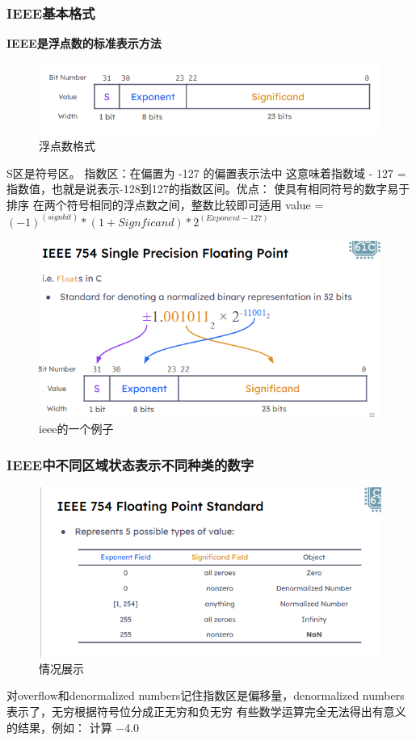 \documentclass{ctexart}
\begin{document}
\subsubsection{IEEE基本格式}
\textbf{IEEE是浮点数的标准表示方法}
\begin{figure}
    \centering
    \includegraphics[width=0.25\linewidth]{浮点数格式.png}
    \caption{浮点数格式}
    \label{fig:enter-label}
\end{figure}
S区是符号区。
指数区：在偏置为 -127 的偏置表示法中
这意味着指数域 - 127 = 指数值，也就是说表示-128到127的指数区间。优点：
使具有相同符号的数字易于排序
在两个符号相同的浮点数之间，整数比较即可适用
value = $(-1)^(sign bit)*(1+Signficand)*2^(Exponent-127)$
\begin{figure}
    \centering
    \includegraphics[width=0.5\linewidth]{ieee的一个例子.png}
    \caption{ieee的一个例子}
    \label{fig:enter-label}
\end{figure}
\subsubsection{IEEE中不同区域状态表示不同种类的数字}
\begin{figure}
    \centering
    \includegraphics[width=0.5\linewidth]{各种情况展示.png}
    \caption{情况展示}
    \label{fig:enter-label}
\end{figure}对overflow和denormalized numbers记住指数区是偏移量，denormalized numbers表示了，无穷根据符号位分成正无穷和负无穷
有些数学运算完全无法得出有意义的结果，例如：
计算 
−4.0
​
 
\end{document}
